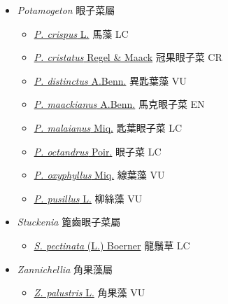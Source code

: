 
  \begin{itemize}
 \item[] \textit{Potamogeton} 眼子菜屬
                                
  \begin{itemize}
        \item[] \href{http://www.theplantlist.org/tpl1.1/search?q=Potamogeton+crispus}{\textit{P. crispus} L.}   馬藻   LC
        \item[] \href{http://www.theplantlist.org/tpl1.1/search?q=Potamogeton+cristatus}{\textit{P. cristatus} Regel \& Maack}   冠果眼子菜   CR
        \item[] \href{http://www.theplantlist.org/tpl1.1/search?q=Potamogeton+distinctus}{\textit{P. distinctus} A.Benn.}   異匙葉藻   VU
        \item[] \href{http://www.theplantlist.org/tpl1.1/search?q=Potamogeton+maackianus}{\textit{P. maackianus} A.Benn.}   馬克眼子菜   EN
        \item[] \href{http://www.theplantlist.org/tpl1.1/search?q=Potamogeton+malaianus}{\textit{P. malaianus} Miq.}   匙葉眼子菜   LC
        \item[] \href{http://www.theplantlist.org/tpl1.1/search?q=Potamogeton+octandrus}{\textit{P. octandrus} Poir.}   眼子菜   LC
        \item[] \href{http://www.theplantlist.org/tpl1.1/search?q=Potamogeton+oxyphyllus}{\textit{P. oxyphyllus} Miq.}   線葉藻   VU
        \item[] \href{http://www.theplantlist.org/tpl1.1/search?q=Potamogeton+pusillus}{\textit{P. pusillus} L.}   柳絲藻   VU
  \end{itemize}
 \item[] \textit{Stuckenia} 篦齒眼子菜屬
                                
  \begin{itemize}
        \item[] \href{http://www.theplantlist.org/tpl1.1/search?q=Stuckenia+pectinata}{\textit{S. pectinata} (L.) Boerner}   龍鬚草   LC
  \end{itemize}
 \item[] \textit{Zannichellia} 角果藻屬
                                
  \begin{itemize}
        \item[] \href{http://www.theplantlist.org/tpl1.1/search?q=Zannichellia+palustris}{\textit{Z. palustris} L.}   角果藻   VU
  \end{itemize}
  \end{itemize}
